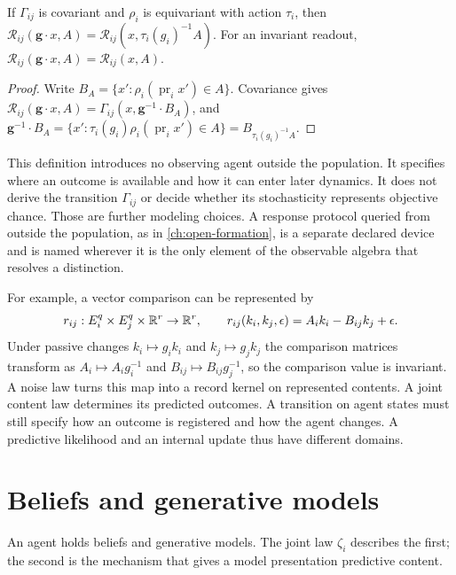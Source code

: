If $\Gamma_{ij}$ is covariant and $\rho_i$ is equivariant with action $\tau_i$, then $\mathcal R_{ij}(\mathbf g\cdot x,A)=\mathcal R_{ij}(x,\tau_i(g_i)^{-1}A)$. For an invariant readout, $\mathcal R_{ij}(\mathbf g\cdot x,A)=\mathcal R_{ij}(x,A)$.
\begin{proof}
Write $B_A=\{x':\rho_i(\operatorname{pr}_ix')\in A\}$. Covariance gives $\mathcal R_{ij}(\mathbf g\cdot x,A)=\Gamma_{ij}(x,\mathbf g^{-1}\cdot B_A)$, and $\mathbf g^{-1}\cdot B_A=\{x':\tau_i(g_i)\rho_i(\operatorname{pr}_ix')\in A\}=B_{\tau_i(g_i)^{-1}A}$.
\end{proof}

This definition introduces no observing agent outside the population. It specifies where an outcome is available and how it can enter later dynamics. It does not derive the transition $\Gamma_{ij}$ or decide whether its stochasticity represents objective chance. Those are further modeling choices. A response protocol queried from outside the population, as in \cref{ch:open-formation}, is a separate declared device and is named wherever it is the only element of the observable algebra that resolves a distinction.

For example, a vector comparison can be represented by
\begin{equation}
r_{ij}:E_i^q\times E_j^q\times\mathbb R^r\to\mathbb R^r,
\qquad
r_{ij}(k_i,k_j,\epsilon)=A_i k_i-B_{ij}k_j+\epsilon.
\label{eq:sample-comparison}
\end{equation}
Under passive changes $k_i\mapsto g_ik_i$ and $k_j\mapsto g_jk_j$ the comparison matrices transform as $A_i\mapsto A_ig_i^{-1}$ and $B_{ij}\mapsto B_{ij}g_j^{-1}$, so the comparison value is invariant. A noise law turns this map into a record kernel on represented contents. A joint content law determines its predicted outcomes. A transition on agent states must still specify how an outcome is registered and how the agent changes. A predictive likelihood and an internal update thus have different domains.

\section{Beliefs and generative models}
\label{sec:generative-models}

An agent holds beliefs and generative models. The joint law $\zeta_i$ describes the first; the second is the mechanism that gives a model presentation predictive content.

